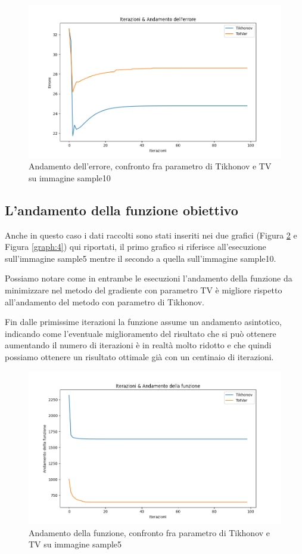 \documentclass[12pt]{article}
\begin{document}
    \begin{figure}[h!]
    \centering
    \includegraphics[width=12cm]{errors-sample10}
    \caption{Andamento dell'errore, confronto fra parametro di Tikhonov e TV su immagine sample10}
    \label{graph:2}
    \end{figure}
    
    \newpage
    \subsection{L'andamento della funzione obiettivo}
    Anche in questo caso i dati raccolti sono stati inseriti nei due grafici (Figura \ref{graph:3} e Figura \ref{graph:4}) qui riportati, il primo grafico si riferisce all'esecuzione sull'immagine sample5 mentre il secondo a quella sull'immagine sample10.
    
    Possiamo notare come in entrambe le esecuzioni l'andamento della funzione da minimizzare nel metodo del gradiente con parametro TV è migliore rispetto all'andamento del metodo con parametro di Tikhonov. 
    
    Fin dalle primissime iterazioni la funzione assume un andamento asintotico, indicando come l'eventuale miglioramento del risultato che si può ottenere aumentando il numero di iterazioni è in realtà molto ridotto e che quindi possiamo ottenere un risultato ottimale già con un centinaio di iterazioni.
    
    \begin{figure}[h!]
    \centering
    \includegraphics[width=12cm]{fun-sample5}
    \caption{Andamento della funzione, confronto fra parametro di Tikhonov e TV su immagine sample5}
    \label{graph:3}
    \end{figure}
    
\end{document}

